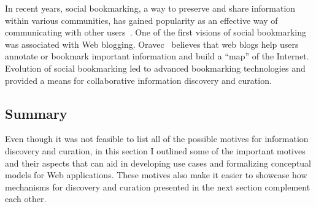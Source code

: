 {{In recent years, social bookmarking, a way to preserve and share information within various communities, has gained popularity as an effective way of communicating with other users~\cite{estelles2010social}. One of the first visions of social bookmarking was associated with Web blogging. Oravec~\cite{oravec2002bookmarking} believes that web blogs help users annotate or bookmark important information and build a ``map'' of the Internet. Evolution of social bookmarking led to advanced bookmarking technologies and provided a means for collaborative information discovery and curation. 
}
{\subsection{Summary}
Even though it was not feasible to list all of the possible motives for information discovery and curation, in this section I outlined some of the important motives and their aspects that can aid in developing use cases and formalizing conceptual models for Web applications. These motives also make it easier to showcase how mechanisms for discovery and curation presented in the next section complement each other.
} 
}

